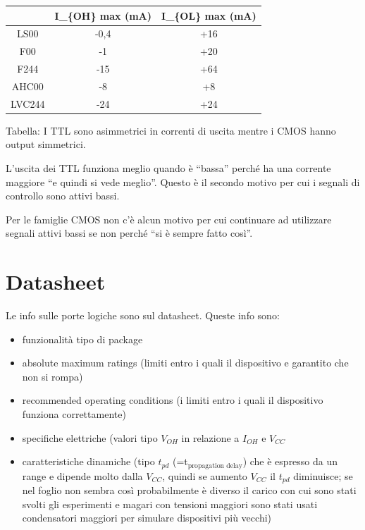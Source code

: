 \documentclass[
]{book}
\providecommand{\tightlist}{%
  \setlength{\itemsep}{0pt}\setlength{\parskip}{0pt}}
\begin{document}
\begin{longtable}[]{@{}ccc@{}}
\toprule\noalign{}
& I\_\{OH\} max (mA) & I\_\{OL\} max (mA) \\
\midrule\noalign{}
\endhead
\bottomrule\noalign{}
\endlastfoot
LS00 & -0,4 & +16 \\
F00 & -1 & +20 \\
F244 & -15 & +64 \\
AHC00 & -8 & +8 \\
LVC244 & -24 & +24 \\
\end{longtable}

Tabella: I TTL sono asimmetrici in correnti di uscita mentre i CMOS
hanno output simmetrici.

L'uscita dei TTL funziona meglio quando è ``bassa'' perché ha una
corrente maggiore ``e quindi si vede meglio''. Questo è il secondo
motivo per cui i segnali di controllo sono attivi bassi.

Per le famiglie CMOS non c'è alcun motivo per cui continuare ad
utilizzare segnali attivi bassi se non perché ``si è sempre fatto
così''.

\section{Datasheet}\label{datasheet}

Le info sulle porte logiche sono sul datasheet. Queste info sono:

\begin{itemize}
\tightlist
\item
  funzionalità tipo di package
\item
  absolute maximum ratings (limiti entro i quali il dispositivo e
  garantito che non si rompa)
\item
  recommended operating conditions (i limiti entro i quali il
  dispositivo funziona correttamente)
\item
  specifiche elettriche (valori tipo \(V_{OH}\) in relazione a
  \(I_{OH}\) e \(V_{CC}\)
\item
  caratteristiche dinamiche (tipo \(t_{pd}\)
  (=t\({}_{\text{propagation delay}}\)) che è espresso da un range e
  dipende molto dalla \(V_{CC}\), quindi se aumento \(V_{CC}\) il
  \(t_{pd}\) diminuisce; se nel foglio non sembra così probabilmente è
  diverso il carico con cui sono stati svolti gli esperimenti e magari
  con tensioni maggiori sono stati usati condensatori maggiori per
  simulare dispositivi più vecchi)
\end{itemize}
\end{document}
